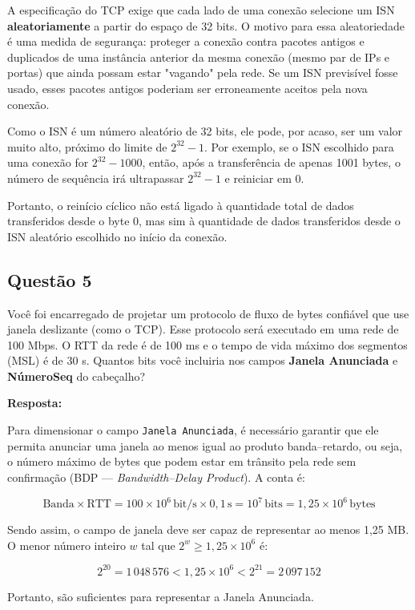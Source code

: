 A especificação do TCP exige que cada lado de uma conexão selecione um ISN \textbf{aleatoriamente} a partir do espaço de 32 bits.  O motivo para essa aleatoriedade é uma medida de segurança: proteger a conexão contra pacotes antigos e duplicados de uma instância anterior da mesma conexão (mesmo par de IPs e portas) que ainda possam estar "vagando" pela rede.  Se um ISN previsível fosse usado, esses pacotes antigos poderiam ser erroneamente aceitos pela nova conexão.

Como o ISN é um número aleatório de 32 bits, ele pode, por acaso, ser um valor muito alto, próximo do limite de $2^{32}-1$. Por exemplo, se o ISN escolhido para uma conexão for $2^{32}-1000$, então, após a transferência de apenas 1001 bytes, o número de sequência irá ultrapassar $2^{32}-1$ e reiniciar em 0.

Portanto, o reinício cíclico não está ligado à quantidade total de dados transferidos desde o byte 0, mas sim à quantidade de dados transferidos desde o ISN aleatório escolhido no início da conexão.

\subsection{Questão 5}
Você foi encarregado de projetar um protocolo de fluxo de bytes confiável que use janela deslizante (como o TCP). Esse protocolo será executado em uma rede de 100 Mbps. O RTT da rede é de 100 ms e o tempo de vida máximo dos segmentos (MSL) é de 30 s.  
Quantos bits você incluiria nos campos \textbf{Janela Anunciada} e \textbf{NúmeroSeq} do cabeçalho?

\noindent\textbf{Resposta:}

Para dimensionar o campo \texttt{Janela Anunciada}, é necessário garantir que ele permita anunciar uma janela ao menos igual ao produto banda–retardo, ou seja, o número máximo de bytes que podem estar em trânsito pela rede sem confirmação (BDP — \textit{Bandwidth–Delay Product}). A conta é:

\[
\text{Banda} \times \text{RTT} = 100\times10^{6} \, \text{bit/s} \times 0{,}1\,\text{s} = 10^7\,\text{bits} = 1{,}25\times10^6\,\text{bytes}
\]

Sendo assim, o campo de janela deve ser capaz de representar ao menos 1,25 MB. O menor número inteiro $w$ tal que $2^w \geq 1{,}25 \times 10^6$ é:

\[
2^{20} = 1\,048\,576 < 1{,}25\times10^6 < 2^{21} = 2\,097\,152
\]

Portanto,  são suficientes para representar a Janela Anunciada.

